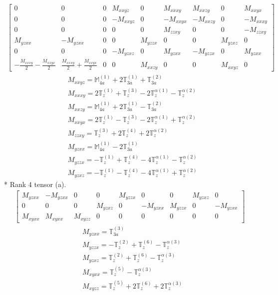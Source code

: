 \documentclass[fleqn,8pt,landscape]{jsarticle}
\begin{document}
\begin{align*}
\begin{bmatrix} 0 & 0 & 0 & M_{xxyz} & 0 & M_{xxxy} & M_{xxzy} & 0 & M_{xxyx} \\ 0 & 0 & 0 & - M_{xxyz} & 0 & - M_{xxyx} & - M_{xxzy} & 0 & - M_{xxxy} \\ 0 & 0 & 0 & 0 & 0 & M_{zzxy} & 0 & 0 & - M_{zzxy} \\ M_{yzxx} & - M_{yzxx} & 0 & 0 & M_{yzzx} & 0 & 0 & M_{yzxz} & 0 \\ 0 & 0 & 0 & - M_{yzxz} & 0 & M_{yzxx} & - M_{yzzx} & 0 & M_{yzxx} \\ - \frac{M_{xxxy}}{2} - \frac{M_{xxyx}}{2} & \frac{M_{xxxy}}{2} + \frac{M_{xxyx}}{2} & 0 & 0 & M_{xxzy} & 0 & 0 & M_{xxyz} & 0 \end{bmatrix}
\end{align*}
\begin{align*}
& M_{xxyz} = \mathbb{M}_{4a}^{(1)} + 2 \mathbb{T}_{3a}^{(1)} + \mathbb{T}_{3a}^{(2)} \\
& M_{xxxy} = 2 \mathbb{T}_{z}^{(1)} + \mathbb{T}_{z}^{(3)} - 2 \mathbb{T}_{z}^{\alpha(1)} - \mathbb{T}_{z}^{\alpha(2)} \\
& M_{xxzy} = \mathbb{M}_{4a}^{(1)} + 2 \mathbb{T}_{3a}^{(1)} - \mathbb{T}_{3a}^{(2)} \\
& M_{xxyx} = 2 \mathbb{T}_{z}^{(1)} - \mathbb{T}_{z}^{(3)} - 2 \mathbb{T}_{z}^{\alpha(1)} + \mathbb{T}_{z}^{\alpha(2)} \\
& M_{zzxy} = \mathbb{T}_{z}^{(3)} + 2 \mathbb{T}_{z}^{(4)} + 2 \mathbb{T}_{z}^{\alpha(2)} \\
& M_{yzxx} = \mathbb{M}_{4a}^{(1)} - 2 \mathbb{T}_{3a}^{(1)} \\
& M_{yzzx} = - \mathbb{T}_{z}^{(1)} + \mathbb{T}_{z}^{(4)} - 4 \mathbb{T}_{z}^{\alpha(1)} - \mathbb{T}_{z}^{\alpha(2)} \\
& M_{yzxz} = - \mathbb{T}_{z}^{(1)} - \mathbb{T}_{z}^{(4)} - 4 \mathbb{T}_{z}^{\alpha(1)} + \mathbb{T}_{z}^{\alpha(2)}
\end{align*}
* Rank 4 tensor (a).
\begin{align*}
\begin{bmatrix} M_{yzxx} & - M_{yzxx} & 0 & 0 & M_{yzzx} & 0 & 0 & M_{yzxz} & 0 \\ 0 & 0 & 0 & M_{yzxz} & 0 & - M_{yzxx} & M_{yzzx} & 0 & - M_{yzxx} \\ M_{xyxx} & M_{xyxx} & M_{xyzz} & 0 & 0 & 0 & 0 & 0 & 0 \end{bmatrix}
\end{align*}
\begin{align*}
& M_{yzxx} = \mathbb{T}_{3a}^{(3)} \\
& M_{yzzx} = - \mathbb{T}_{z}^{(2)} + \mathbb{T}_{z}^{(6)} - \mathbb{T}_{z}^{\alpha(3)} \\
& M_{yzxz} = \mathbb{T}_{z}^{(2)} + \mathbb{T}_{z}^{(6)} - \mathbb{T}_{z}^{\alpha(3)} \\
& M_{xyxx} = \mathbb{T}_{z}^{(5)} - \mathbb{T}_{z}^{\alpha(3)} \\
& M_{xyzz} = \mathbb{T}_{z}^{(5)} + 2 \mathbb{T}_{z}^{(6)} + 2 \mathbb{T}_{z}^{\alpha(3)}
\end{align*}
\end{document}
